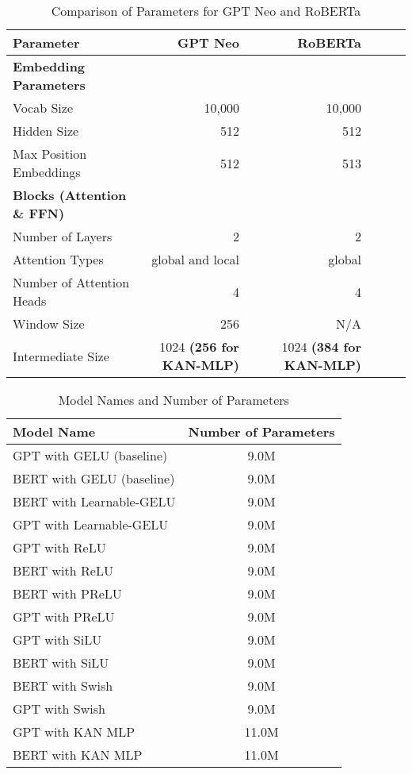 \begin{table*}[h!]
    \centering
    \begin{tabular}{lrrrrr}
    \hline
    \toprule \textbf{Parameter} & \textbf{GPT Neo} & \textbf{RoBERTa} \\ \hline
    \toprule \textbf{Embedding Parameters} & & \\ \hline
    Vocab Size & 10,000 & 10,000 \\ \hline
    Hidden Size & 512 & 512 \\ \hline
    Max Position Embeddings & 512 & 513 \\ \hline
    \toprule \textbf{Blocks (Attention \& FFN)} & & \\ \hline
    Number of Layers & 2 & 2 \\ \hline
    Attention Types & global and local & global \\ \hline
    Number of Attention Heads & 4 & 4 \\ \hline
    Window Size & 256 & N/A \\ \hline
    Intermediate Size & 1024 \textbf{(256 for KAN-MLP)} & 1024 \textbf{(384 for KAN-MLP)} \\ \hline
    \end{tabular}
    \caption{Comparison of Parameters for GPT Neo and RoBERTa}
    \label{tab:Hyperparameters}
\end{table*}

\begin{table}[h!]
    \centering
    \begin{tabular}{|l|c|}
    \hline
    \textbf{Model Name} & \textbf{Number of Parameters} \\ \hline
    GPT with GELU (baseline) & 9.0M \\ \hline
    BERT with GELU (baseline) & 9.0M \\ \hline
    BERT with Learnable-GELU & 9.0M \\ \hline
    GPT with Learnable-GELU & 9.0M \\ \hline
    GPT with ReLU & 9.0M \\ \hline
    BERT with ReLU & 9.0M \\ \hline
    BERT with PReLU & 9.0M \\ \hline
    GPT with PReLU & 9.0M \\ \hline
    GPT with SiLU & 9.0M \\ \hline
    BERT with SiLU & 9.0M \\ \hline
    BERT with Swish & 9.0M \\ \hline
    GPT with Swish & 9.0M \\ \hline
    GPT with KAN MLP & 11.0M \\ \hline
    BERT with KAN MLP & 11.0M \\ \hline
    \end{tabular}
    \caption{Model Names and Number of Parameters}
    \label{tab:parameter-counts}
\end{table}